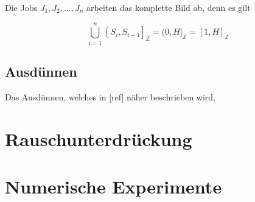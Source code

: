 \documentclass[a4paper, 11pt]{report}
\theoremstyle{definition}
\begin{document}
				Die Jobs $J_1, J_2, ..., J_n$ arbeiten das komplette Bild ab, denn es gilt

				$$ \bigcup_{i=1}^n \left(S_i, S_{i+1}\right]_\mathbb{Z} = (0,H]_\mathbb{Z} = [1,H]_\mathbb{Z} $$

			\subsection{Ausdünnen}
				Das Ausdünnen, welches in [ref] näher beschrieben wird, 

		\section{Rauschunterdrückung}


		\section{Numerische Experimente}


%
\end{document}
